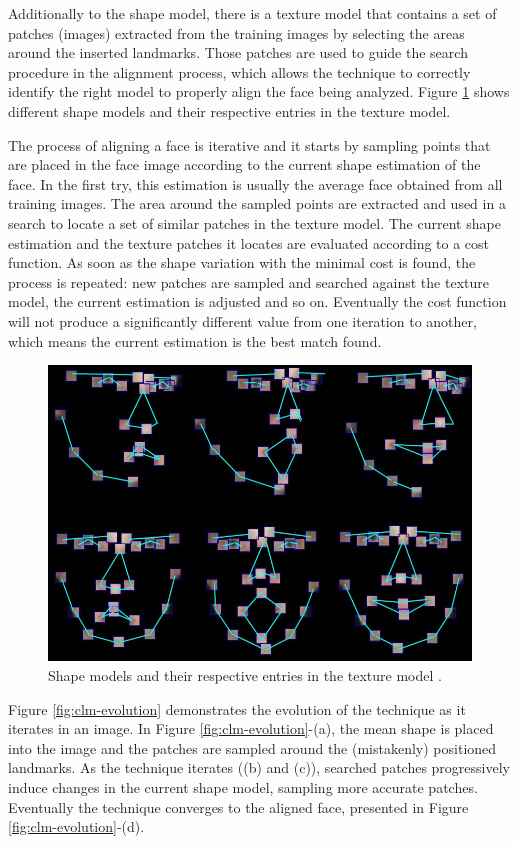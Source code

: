 Additionally to the shape model, there is a texture model that contains a set of patches (images) extracted from the training images by selecting the areas around the inserted landmarks. Those patches are used to guide the search procedure in the alignment process, which allows the technique to correctly identify the right model to properly align the face being analyzed. Figure \ref{fig:clm-patches} shows different shape models and their respective entries in the texture model.

The process of aligning a face is iterative and it starts by sampling points that are placed in the face image according to the current shape estimation of the face. In the first try, this estimation is usually the average face obtained from all training images. The area around the sampled points are extracted and used in a search to locate a set of similar patches in the texture model. The current shape estimation and the texture patches it locates are evaluated according to a cost function. As soon as the shape variation with the minimal cost is found, the process is repeated: new patches are sampled and searched against the texture model, the current estimation is adjusted and so on. Eventually the cost function will not produce a significantly different value from one iteration to another, which means the current estimation is the best match found.

\begin{figure}[h]
    \centering
    \includegraphics[width=0.6\linewidth]{Content/figures/clm-patches.jpg}
    \caption{Shape models and their respective entries in the texture model \parencite{yu2010facial}.}
    \label{fig:clm-patches}
\end{figure}

Figure \ref{fig:clm-evolution} demonstrates the evolution of the technique as it iterates in an image. In Figure \ref{fig:clm-evolution}-(a), the mean shape is placed into the image and the patches are sampled around the (mistakenly) positioned landmarks. As the technique iterates ((b) and (c)), searched patches progressively induce changes in the current shape model, sampling more accurate patches. Eventually the technique converges to the aligned face, presented in Figure \ref{fig:clm-evolution}-(d).

